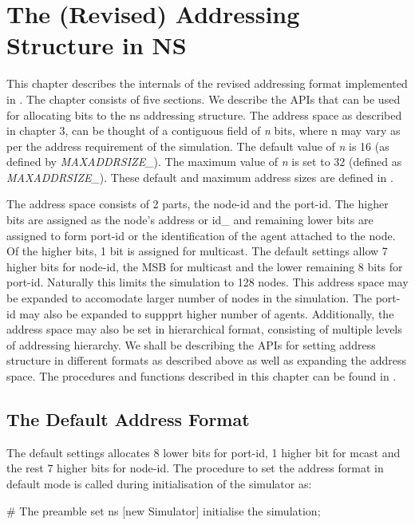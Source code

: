 \chapter{The (Revised) Addressing Structure in NS}
\label{chap:Address}

This chapter describes the internals of the revised addressing format
implemented in \ns. The chapter consists of five sections. We
describe the APIs that can be used for allocating bits to the ns addressing
structure. The address space as described in chapter 3, can be thought
of a contiguous field of {\em n} bits, where n may vary as per the
address requirement of the simulation. The default value of {\em n} is
16 (as defined by {\em MAXADDRSIZE\_}). The maximum value of {\em n} is
set to 32 (defined as {\em MAXADDRSIZE\_}). These default and maximum 
address sizes are defined in .

The address space consists of 2 parts, the node-id and the port-id.
The higher bits are assigned as the node's
address or id\_ and remaining lower bits are assigned to form port-id or
the identification of the agent attached to the node. Of the higher
bits, 1 bit is assigned for multicast. The default settings allow 7
higher bits for node-id, the MSB for multicast and the lower remaining 8
bits for port-id. Naturally this limits the simulation to 128
nodes. This address space may be expanded to accomodate
larger number of nodes in the simulation. The port-id may also be
expanded to 
suppprt higher number of agents. Additionally, the address space may
also be set in hierarchical format, consisting of multiple levels of
addressing hierarchy. 
We shall be describing the APIs for setting address structure in
different formats as described above as well as expanding the address
space. 
The procedures and functions described in this chapter can be found in
.

\section{The Default Address Format}
\label{sec:defaultFormat}

The default settings allocates 8 lower bits for port-id, 1 higher bit
for mcast and the rest 7 higher bits for node-id. The procedure to set
the address format in default mode is called during initialisation of
the simulator as:


\begin{program}
{\cf # The preamble}
set ns [new Simulator]                  \; initialise the simulation;
\end{program}

